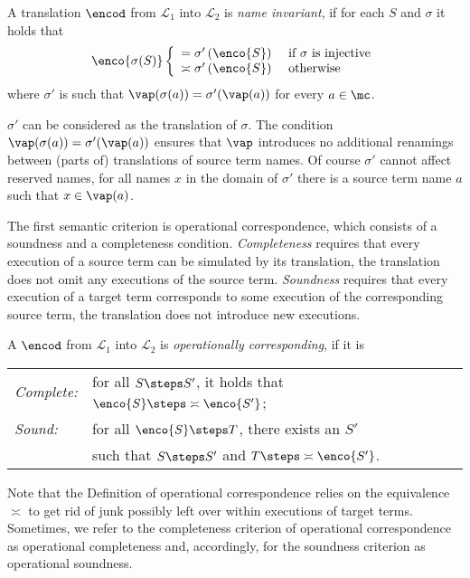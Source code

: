\documentclass[]{article}
\begin{document}
	\label{ninv}
	A translation $\encod$ from $\mathcal{L}_1$ into $\mathcal{L}_2$ is \emph{name invariant}, if for each $S$ and $\sigma$ it holds that 
$$\enco{\sigma(S)} \left\{\begin{array}{ll}= \sigma'\left(\enco{S}\right)&\mbox{ if }\sigma\mbox{ is injective}\\\asymp \sigma'\left(\enco{S}\right)&\mbox{ otherwise}\end{array}\right.$$ 
where $\sigma'$ is such that $ \vap(\sigma(a)) = \sigma'(\vap(a)) $ for every $a \in \mc $.
\ekrit

$ \sigma' $ can be considered as the translation of $ \sigma $. The condition $ \vap(\sigma(a)) = \sigma'(\vap(a)) $ ensures that $ \vap $ introduces no additional renamings between (parts of) translations of source term names. Of course $ \sigma' $ cannot affect reserved names, \ie for all names $ x $ in the domain of $ \sigma' $ there is a source term name $ a $ such that $ x \in \vap\!\left( a \right) $.

The first semantic criterion is operational correspondence, which consists of a soundness and a completeness condition.
\emph{Completeness} requires that every execution of a source term can be simulated by its translation, \ie the translation does not omit any executions of the source term. \emph{Soundness} requires that every execution of a target term corresponds to some execution of the corresponding source term, \ie the translation does not introduce new executions.

	\label{opco}
	A $\encod$ from $\mathcal{L}_1$ into $\mathcal{L}_2$ is \emph{operationally corresponding}, if it is\\
	\begin{tabular}{l@{\;\;}l}
		\emph{Complete:} & for all $ S \steps S' $, it holds that $ \enco{S} \steps \asymp \enco{S'} $;\\
		\emph{Sound:} & for all $ \enco{S} \steps T $, there exists an $ S' $\\
		& such that $ S \steps S' $ and $ T \steps \asymp \enco{S'} $.
	\end{tabular}
\ekrit

\noindent
Note that the Definition of operational correspondence relies on the equivalence $ \asymp $ to get rid of junk possibly left over within executions of target terms. Sometimes, we refer to the completeness criterion of operational correspondence as operational completeness and, accordingly, for the soundness criterion as operational soundness.
\end{document}
